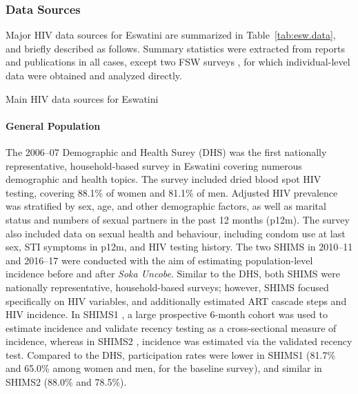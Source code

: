 \subsubsection{Data Sources}\label{intro.esw.hiv.data}
Major HIV data sources for Eswatini are summarized in Table~\ref{tab:esw.data},
and briefly described as follows.
Summary statistics were extracted from reports and publications in all cases,
except two FSW surveys \cite{Baral2014,EswKP2014},
for which individual-level data were obtained and analyzed directly.
\begin{table}
  \centering
  \caption{Main HIV data sources for Eswatini}
  \label{tab:esw.data}
  
\end{table}
\paragraph{General Population}
The 2006--07 Demographic and Health Surey (DHS) \cite{SDHS2006} was
the first nationally representative, household-based survey in Eswatini
covering numerous demographic and health topics.
The survey included dried blood spot HIV testing, covering 88.1\% of women and 81.1\% of men.
Adjusted HIV prevalence was stratified by sex, age, and other demographic factors, as well as
marital status and numbers of sexual partners in the past 12 months (p12m).
The survey also included data on sexual health and behaviour, including
condom use at last sex, STI symptoms in p12m, and HIV testing history.
The two SHIMS in 2010--11 \cite{SHIMS1} and 2016--17 \cite{SHIMS2} were conducted
with the aim of estimating population-level incidence before and after \emph{Soka Uncobe}.
Similar to the DHS, both SHIMS were nationally representative, household-based surveys;
however, SHIMS focused specifically on HIV variables, and additionally estimated
ART cascade steps and HIV incidence.
In SHIMS1 \cite{SHIMS1}, a large prospective 6-month cohort was used to estimate incidence
and validate recency testing \cite{Duong2012} as a cross-sectional measure of incidence, whereas
in SHIMS2 \cite{SHIMS2}, incidence was estimated via the validated recency test.
Compared to the DHS, participation rates were
lower in SHIMS1 (81.7\% and 65.0\% among women and men, for the baseline survey),
and similar in SHIMS2 (88.0\% and 78.5\%).
